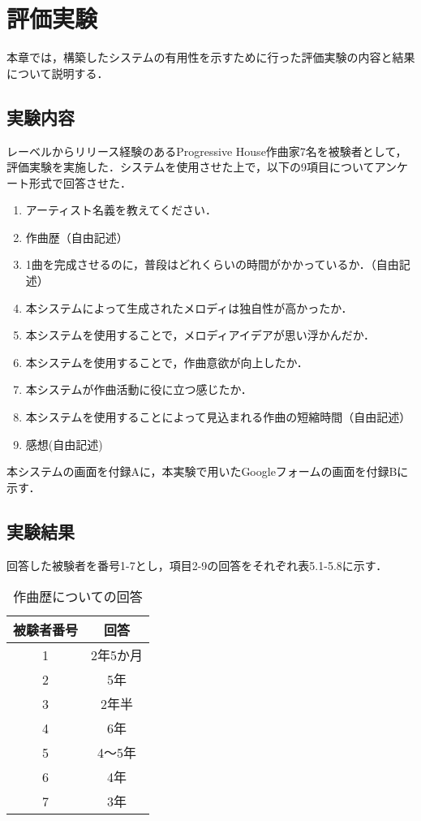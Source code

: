 \chapter{評価実験}
本章では，構築したシステムの有用性を示すために行った評価実験の内容と結果について説明する．

\section{実験内容}
レーベルからリリース経験のあるProgressive House作曲家7名を被験者として，評価実験を実施した．システムを使用させた上で，以下の9項目についてアンケート形式で回答させた．
\begin{enumerate}
  \item アーティスト名義を教えてください．
  \item 作曲歴（自由記述）
  \item 1曲を完成させるのに，普段はどれくらいの時間がかかっているか．（自由記述）
  \item 本システムによって生成されたメロディは独自性が高かったか．
  \item 本システムを使用することで，メロディアイデアが思い浮かんだか．
  \item 本システムを使用することで，作曲意欲が向上したか．
  \item 本システムが作曲活動に役に立つ感じたか．
  \item 本システムを使用することによって見込まれる作曲の短縮時間（自由記述）
  \item 感想(自由記述)
\end{enumerate}
本システムの画面を付録Aに，本実験で用いたGoogleフォームの画面を付録Bに示す．

\section{実験結果}
回答した被験者を番号1-7とし，項目2-9の回答をそれぞれ表5.1-5.8に示す．

\begin{table}[htbp]
  \begin{center}
    \caption{作曲歴についての回答}
    \begin{tabular}{|c|c|}
      \hline
      被験者番号 & 回答 \rule[-3mm]{0mm}{8mm}\\ \hline \hline
      1 & 2年5か月\rule[-3mm]{0mm}{8mm} \\ \hline
      2 & 5年\rule[-3mm]{0mm}{8mm} \\ \hline
      3 & 2年半\rule[-3mm]{0mm}{8mm} \\ \hline
      4 & 6年\rule[-3mm]{0mm}{8mm} \\ \hline
      5 & 4〜5年\rule[-3mm]{0mm}{8mm} \\ \hline
      6 & 4年\rule[-3mm]{0mm}{8mm} \\ \hline
      7 & 3年\rule[-3mm]{0mm}{8mm} \\ \hline
    \end{tabular}
  \end{center}
\end{table}

